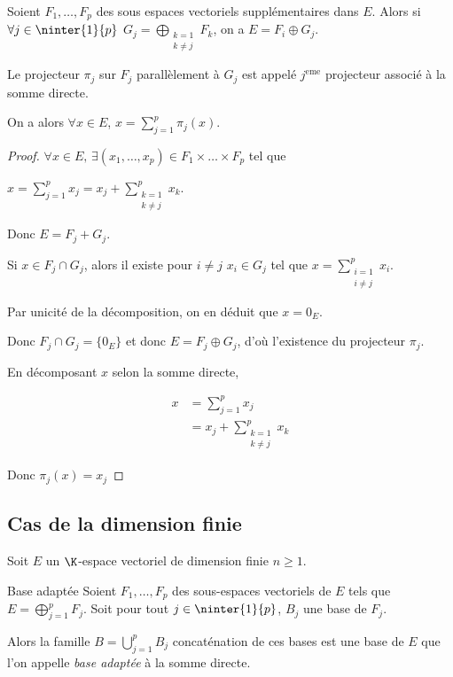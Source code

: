 \begin{theoreme}{}{}
    Soient $F_1, \dots, F_p$ des sous espaces vectoriels supplémentaires dans $E$.
    Alors si $\forall j \in \ninter{1}{p}$ $\displaystyle G_j = \bigoplus_{\substack{k = 1 \\ k \neq j}} F_k$,
    on a $E = F_i \oplus G_j$. 

    Le projecteur $\pi_j$ sur $F_j$ parallèlement à $G_j$ est appelé $j^{\text{eme}}$ projecteur associé à la somme directe. 

    On a alors $\forall x \in E$, $\displaystyle x = \sum_{j=1} ^p \pi_j(x)$.
\end{theoreme}

\begin{proof}
    $\forall x \in E, \, \exists (x_1, \dots, x_p) \in F_1 \times \dots \times F_p$ tel que

    $\displaystyle x = \sum_{j=1}^p x_j = x_j + \sum_{\substack{k=1 \\ k \neq j}}^p x_k$.

    Donc $E = F_j + G_j$.

    Si $x \in F_j \cap G_j$, alors il existe pour $i \neq j$ $x_i \in G_j$ tel que 
    $\displaystyle x = \sum_{\substack{i = 1 \\ i \neq j}}^{p } x_i$.

    Par unicité de la décomposition, on en déduit que $x = 0_E$.

    Donc $F_j \cap G_j = \{0_E\}$ et donc $E = F_j \oplus G_j$, d'où l'existence 
    du projecteur $\pi_j$.

    En décomposant $x$ selon la somme directe, 

    \begin{align}
        x & = \sum_{j=1}^p x_j \\
        & = x_j + \sum_{\substack{k=1 \\ k \neq j}}^p x_k 
    \end{align}

    Donc $\pi_j(x) = x_j$ 
\end{proof}

\subsection{Cas de la dimension finie }

Soit $E$ un $\K$-espace vectoriel de dimension finie $n \geqslant 1$. 

\begin{theoreme}{Base adaptée}{}
    Soient $F_1, \dots, F_p$ des sous-espaces vectoriels de $E$ tels que $\displaystyle E = \bigoplus_{j=1}^p F_j$.
    Soit pour tout $j \in \ninter{1}{p}$, $B_j$ une base de $F_j$.

    Alors la famille $\displaystyle B = \bigcup_{j=1}^p B_j$ concaténation de ces bases est une base de $E$
    que l'on appelle \emph{base adaptée} à la somme directe.
\end{theoreme}

